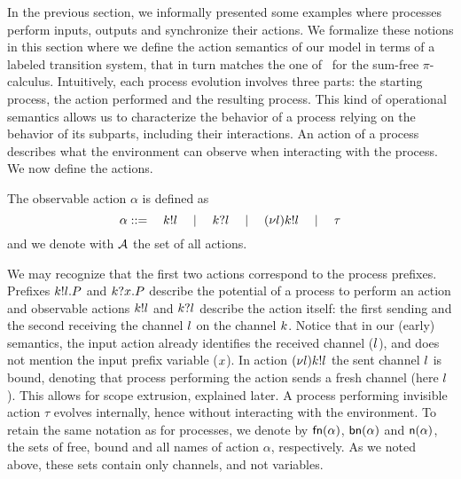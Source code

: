 In the previous section, we informally presented some examples where processes perform inputs, outputs and synchronize their actions. 
We formalize these notions in this section where we define the action semantics of our model in terms of a labeled transition system, that in turn matches the one of~\cite{pi_calculus} for the sum-free $\pi$-calculus.
Intuitively, each process evolution involves three parts: the starting process, the action performed and the resulting process. 
This kind of operational semantics allows us to characterize the behavior of a process relying on the behavior of its subparts, including their interactions.
An action of a process describes what the environment can observe when interacting with the process. We now define the actions.
%
\begin{definition}[Actions]\label{def:Cpi_actions}
The observable action $\alpha$ is defined as   
\[
\alpha ::= \quad k!l \quad \;|\; \quad k?l \quad \;|\; \quad (\nu l)k!l \quad \;|\; \quad \tau
\]
and we denote with ${\cal A}$ the set of all actions.
\end{definition}
%
We may recognize that the first two actions correspond to the process prefixes. 
Prefixes $k!l.P$ and $k?x.P$ 
describe the potential of a process to perform an action and observable actions 
$k!l$ and $k?l$ describe the action itself:
the first sending and the second receiving the channel $l$ on the channel $k$. 
Notice that in our (early) semantics, the input action already identifies the received channel ($l$), and does not mention the input prefix variable ($x$). 
In action $(\nu l)k!l$ the sent channel $l$ is bound, denoting that process performing the action sends a fresh channel (here $l$). 
This allows for scope extrusion, explained later.
A process performing invisible action $\tau$ evolves internally, hence without interacting with the environment.
To retain the same notation as for processes, we denote by 
$\mathsf{fn}(\alpha)$, $\mathsf{bn}(\alpha)$ and $\mathsf{n}(\alpha)$, the sets of free, bound and all names of action $\alpha$, respectively. 
As we noted above, these sets contain only channels, and not variables.
%
